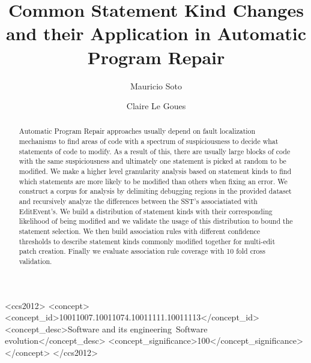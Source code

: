 \documentclass[sigconf]{acmart}
\begin{document}
\title{Common Statement Kind Changes and their Application in Automatic Program Repair}


\author{Mauricio Soto}

\author{Claire Le Goues}




\begin{abstract}
Automatic Program Repair approaches usually depend on fault localization
mechanisms to find areas of code with a spectrum of suspiciousness to 
decide what statements of code to modify. As a result of this, there
are usually large blocks of code with the same suspiciousness and 
ultimately one statement is picked at random to be modified.
We make a higher level granularity analysis based on statement kinds
to find which statements are more likely to be modified than others
when fixing an error.
We construct a corpus for analysis by 
delimiting debugging regions in the provided dataset and 
recursively analyze the
differences between the SST's associatiated with EditEvent's. 
We build a distribution of statement kinds with their corresponding
likelihood of being modified and we validate the usage of this 
distribution to bound the statement selection.
We then build association rules with different
confidence thresholds to describe statement kinds commonly modified
together for multi-edit patch creation. Finally
we evaluate association rule coverage with 10 fold cross validation. 


\end{abstract}

%
%
\begin{CCSXML}
<ccs2012>
<concept>
<concept_id>10011007.10011074.10011111.10011113</concept_id>
<concept_desc>Software and its engineering~Software evolution</concept_desc>
<concept_significance>100</concept_significance>
</concept>
</ccs2012>
\end{CCSXML}
\end{document}
